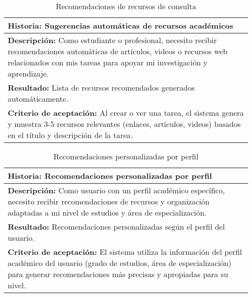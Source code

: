\documentclass[11pt]{article}
\begin{document}
\begin{table}[H]
    \centering
    \begin{tabular}{|p{15cm}|}
    \hline
    \textbf{Historia: }Sugerencias automáticas de recursos académicos\\
    \hline
    \textbf{Descripción: }Como estudiante o profesional, necesito recibir recomendaciones automáticas de artículos, videos o 
    recursos web relacionados con mis tareas para apoyar mi investigación y aprendizaje.\\
    \hline
    \textbf{Resultado: }Lista de recursos recomendados generados automáticamente.\\
    \hline
    \textbf{Criterio de aceptación: } Al crear o ver una tarea, el sistema genera y muestra 3-5 recursos relevantes
     (enlaces, artículos, videos) basados en el título y descripción de la tarea.\\
    \hline
    \end{tabular}
    \caption{Recomendaciones de recursos de consulta}
    \label{user-story7}
\end{table}

\begin{table}[H]
    \centering
    \begin{tabular}{|p{15cm}|}
    \hline
    \textbf{Historia: } Recomendaciones personalizadas por perfil\\
    \hline
    \textbf{Descripción: }Como usuario con un perfil académico específico, necesito recibir recomendaciones de 
    recursos y organización adaptadas a mi nivel de estudios y área de especialización.\\
    \hline
    \textbf{Resultado: } Recomendaciones personalizadas según el perfil del usuario.\\
    \hline
    \textbf{Criterio de aceptación: } El sistema utiliza la información del perfil académico del usuario (grado de estudios, 
    área de especialización) para generar recomendaciones más precisas y apropiadas para su nivel.\\
    \hline
    \end{tabular}
    \caption{Recomendaciones personalizadas por perfil}
    \label{user-story8}
\end{table}
\end{document}
